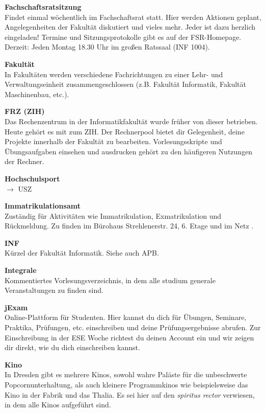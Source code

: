 \textbf{Fachschaftsratsitzung} \\
Findet einmal wöchentlich im Fachschaftsrat statt.
Hier werden Aktionen geplant, Angelegenheiten der Fakultät diskutiert und vieles mehr.
Jeder ist dazu herzlich eingeladen!
Termine und Sitzungsprotokolle gibt es auf der FSR-Homepage.
Derzeit:
Jeden Montag 18.30 Uhr im großen Ratssaal (INF 1004).

\textbf{Fakultät} \\
In Fakultäten werden verschiedene Fachrichtungen zu einer Lehr- und Verwaltungseinheit zusammengeschlossen (z.B. Fakultät Informatik, Fakultät Maschinenbau, etc.).

\textbf{FRZ (ZIH)} \\
Das Rechenzentrum in der Informatikfakultät wurde früher von dieser betrieben.
Heute gehört es mit zum ZIH.
Der Rechnerpool bietet dir Gelegenheit, deine Projekte innerhalb der Fakultät zu bearbeiten.
Vorlesungsskripte und Übungsaufgaben einsehen und ausdrucken gehört zu den häufigeren Nutzungen der Rechner.

\textbf{Hochschulsport} \\
$\rightarrow$ USZ

\textbf{Immatrikulationsamt} \\
Zuständig für Aktivitäten wie Immatrikulation, Exmatrikulation und Rückmeldung.
Zu finden im Bürohaus Strehlenerstr. 24, 6. Etage und im Netz .

\textbf{INF} \\
Kürzel der Fakultät Informatik. 
Siehe auch APB.

\textbf{Integrale} \\
Kommentiertes Vorlesungsverzeichnis, in dem alle studium generale Veranstaltungen zu finden sind.

\textbf{jExam} \\
Online-Plattform für Studenten.
Hier kannst du dich für Übungen, Seminare, Praktika, Prüfungen, etc. einschreiben und deine Prüfungsergebnisse abrufen.
Zur Einschreibung in der ESE Woche richtest du deinen Account ein und wir zeigen dir direkt, wie du dich einschreiben kannst.

\textbf{Kino} \\
In Dresden gibt es mehrere Kinos, sowohl wahre Paläste für die unbeschwerte Popcornunterhaltung, als auch kleinere Programmkinos wie beispielsweise das Kino in der Fabrik und das Thalia.
Es sei hier auf den \textit{spiritus rector} verwiesen, in dem alle Kinos aufgeführt sind.

